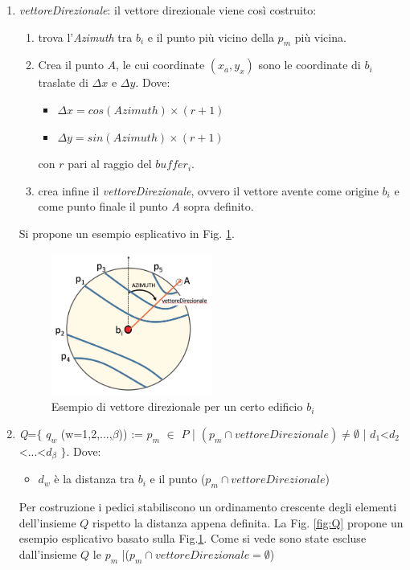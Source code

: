 \begin{enumerate}
\item \textit{vettoreDirezionale}: il vettore direzionale viene così costruito:
	\begin{enumerate}
	\item trova l'\textit{Azimuth} tra $b_i$ e il punto più vicino della $p_m$ più vicina.
    \item Crea il punto $A$, le cui coordinate $(x_a,y_x)$ sono le coordinate di $b_i$ traslate di $\Delta{x}$ e $\Delta{y}$. \newline
    Dove:
    	\begin{itemize}
    		\item $\Delta{x}= cos (Azimuth) \times (r+1)$
            \item $\Delta{y}= sin (Azimuth) \times (r+1)$
    	\end{itemize}
    con $r$ pari al raggio del $buffer_i$.
    \item crea infine il \textit{vettoreDirezionale}, ovvero il vettore avente come origine $b_i$ e come punto finale il punto $A$ sopra definito.
	\end{enumerate}
    Si propone un esempio esplicativo in Fig. \ref{fig:vettore}.
  \begin{figure}[bth]
  \centering
    \includegraphics[width=0.5\textwidth]{img/vettore}
      \caption{Esempio di vettore direzionale per un certo edificio $b_i$}
        \label{fig:vettore}

\end{figure}
\newpage
\item \textit{Q}=$\{$ $q_w$ (w=1,2,...,$\beta$)) :=  $p_m$ $\in$ $P$ | $(p_m \cap vettoreDirezionale) \neq \emptyset$ | $d_1$<$d_2$<...<$d_\beta$ $\}$.
\newline
Dove:
\begin{itemize}
\item $d_w$ è la distanza tra $b_i$ e il punto ($p_m \cap vettoreDirezionale$) 
\end{itemize}
Per costruzione i pedici stabiliscono un ordinamento crescente degli elementi dell'insieme $Q$ rispetto la distanza appena definita.\newline
La Fig. \ref{fig:Q} propone un esempio esplicativo basato sulla Fig.\ref{fig:vettore}. Come si vede sono state escluse dall'insieme $Q$ le $p_m$ |($p_m \cap vettoreDirezionale = \emptyset$)  



\end{enumerate}
